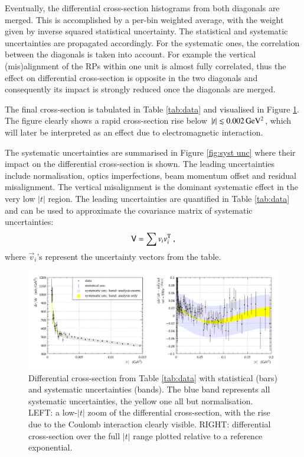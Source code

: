 Eventually, the differential cross-section histograms from both diagonals are merged. This is accomplished by a per-bin weighted average, with the weight given by inverse squared statistical uncertainty. The statistical and systematic uncertainties are propagated accordingly. For the systematic ones, the correlation between the diagonals is taken into account. For example the vertical (mis)alignment of the RPs within one unit is almost fully correlated, thus the effect on differential cross-section is opposite in the two diagonals and consequently its impact is strongly reduced once the diagonals are merged.

The final cross-section is tabulated in Table \ref{tab:data} and visualised in Figure \ref{fig:dsdt}. The figure clearly shows a rapid cross-section rise below $|t| \lesssim 0.002\,{\rm GeV^2}$, which will later be interpreted as an effect due to electromagnetic interaction.

The systematic uncertainties are summarised in Figure \ref{fig:syst unc} where their impact on the differential cross-section is shown. The leading uncertainties include normalisation, optics imperfections, beam momentum offset and residual misalignment. The vertical misalignment is the dominant systematic effect in the very low $|t|$ region. The leading uncertainties are quantified in Table \ref{tab:data} and can be used to approximate the covariance matrix of systematic uncertainties:
\begin{equation}
\label{eq:covar mat}
\mathsf{V} = \sum v_i v_i^{\rm T}\ ,
\end{equation}
where $\vec v_i$'s represent the uncertainty vectors from the table.







\begin{figure}
\vskip-5mm
\begin{center}
\includegraphics[width=18cm]{fig/t_dist_tabulation.pdf}
\vskip-3mm
\caption{%
Differential cross-section from Table \ref{tab:data} with statistical (bars) and systematic uncertainties (bands). The blue band represents all systematic uncertainties, the yellow one all but normalisation. LEFT: a low-$|t|$ zoom of the differential cross-section, with the rise due to the Coulomb interaction clearly visible. RIGHT: differential cross-section over the full $|t|$ range plotted relative to a reference exponential.
}
\label{fig:dsdt}
\end{center}
\end{figure}


